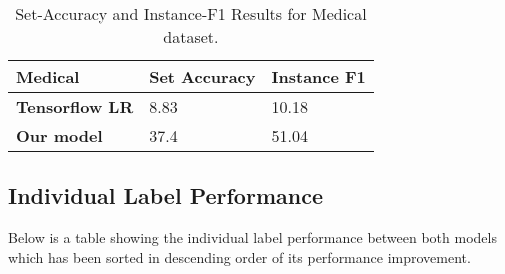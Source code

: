\begin{table}[htbp]
\begin{tabular}{l|l|l}
Medical                & \multicolumn{1}{c|}{\textbf{Set Accuracy}} & \multicolumn{1}{c}{\textbf{Instance F1}} \\ \hline
\textbf{Tensorflow LR} & 8.83                                       & 10.18                                    \\
\textbf{Our model}     & 37.4                                       & 51.04                                   
\end{tabular}
\caption{\label{tab:widgets}Set-Accuracy and Instance-F1 Results for Medical dataset.}
\end{table}

\subsection{Individual Label Performance}

Below is a table showing the individual label performance between both models which has been sorted in descending order of its performance improvement.

